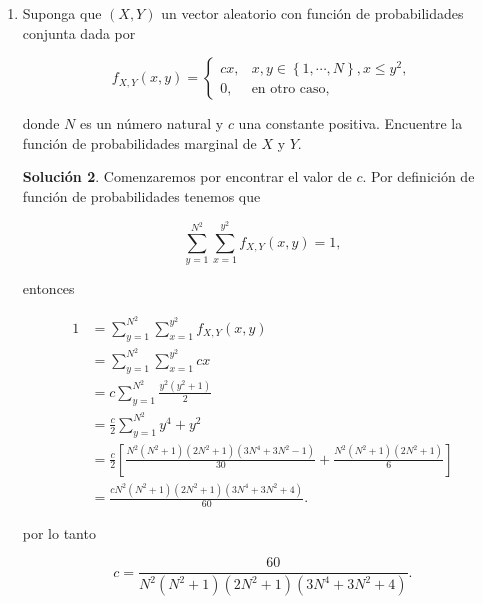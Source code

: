 \documentclass[letterpaper]{article}
\theoremstyle{definition}
\theoremstyle{lemathm}
\theoremstyle{lemathm}
\newtheorem{sol}{Solución}
\theoremstyle{lemathm}
\theoremstyle{lemademthm}
\newcommand{\pars}[1]{\left( #1 \right) }
\newcommand{\bracs}[1]{\left[ #1 \right] }
\newcommand{\set}[1]{\left \{ #1 \right\} }
\newcommand{\1}{\mathbbm{1}}
\begin{document}
\begin{enumerate}
\begin{enumerate}
\begin{sol}
				si $y \in \set{1,\cdots,N}$ en otro caso $0$,
			\end{sol}

			\item ¿Son $X$ y $Y$ variables aleatorias independientes? 
			
			\begin{proof}
				Puesto que

				\[f_{X,Y}(x,y) = \frac{6}{N^2(N+1)(2N+1)}x^2 = \frac{6x^2}{N(N+1)(2N+1)} \frac{1}{N} = f_X(x) f_Y(y),\]

				concluimos que $X$ y $Y$ son independientes.
			\end{proof}
		\end{enumerate}

		\item Suponga que $\pars{X,Y}$ un vector aleatorio con función de probabilidades conjunta dada por
		
		\[f_{X,Y}(x,y) = \begin{cases}
			cx, & x,y\in\set{1,\cdots,N}, x\leq y^2,\\
			0, &\text{en otro caso},
		\end{cases}\]

		donde $N$ es un número natural y $c$ una constante positiva. Encuentre la función de probabilidades marginal de $X$ y $Y$.

		\begin{sol}

			Comenzaremos por encontrar el valor de $c$. Por definición de función de probabilidades tenemos que

			\[\sum_{y=1}^{N^2}\sum_{x=1}^{y^2} f_{X,Y}(x,y) = 1,\]

			entonces

			\begin{align*}
				1 &= \sum_{y=1}^{N^2}\sum_{x=1}^{y^2} f_{X,Y}(x,y)\\
				&= \sum_{y=1}^{N^2}\sum_{x=1}^{y^2} cx\\
				&= c\sum_{y=1}^{N^2} \frac{y^2(y^2+1)}{2}\\
				&= \frac{c}{2} \sum_{y=1}^{N^2} y^4 + y^2\\
				&= \frac{c}{2} \bracs{\frac{N^2(N^2+1)(2N^2+1)(3N^4+3N^2-1)}{30} + \frac{N^2(N^2+1)(2N^2+1)}{6}}\\
				&= \frac{cN^2(N^2+1)(2N^2+1)(3N^4+3N^2+4)}{60}.
			\end{align*}

			por lo tanto

			\[c = \frac{60}{N^2(N^2+1)(2N^2+1)(3N^4+3N^2+4)}.\]


\end{sol}
\end{enumerate}
\end{document}
